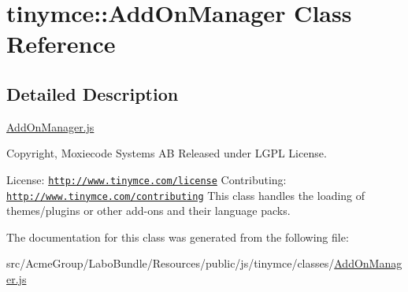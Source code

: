 \hypertarget{classtinymce_1_1_add_on_manager}{\section{tinymce\+:\+:Add\+On\+Manager Class Reference}
\label{classtinymce_1_1_add_on_manager}
}


\subsection{Detailed Description}
\hyperlink{_add_on_manager_8js}{Add\+On\+Manager.\+js}

Copyright, Moxiecode Systems A\+B Released under L\+G\+P\+L License.

License\+: \href{http://www.tinymce.com/license}{\tt http\+://www.\+tinymce.\+com/license} Contributing\+: \href{http://www.tinymce.com/contributing}{\tt http\+://www.\+tinymce.\+com/contributing} This class handles the loading of themes/plugins or other add-\/ons and their language packs. 

The documentation for this class was generated from the following file\+:\begin{DoxyCompactItemize}
\item 
src/\+Acme\+Group/\+Labo\+Bundle/\+Resources/public/js/tinymce/classes/\hyperlink{_add_on_manager_8js}{Add\+On\+Manager.\+js}\end{DoxyCompactItemize}
